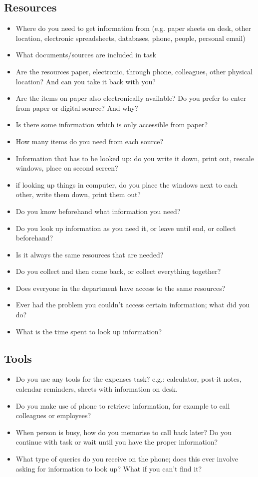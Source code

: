 \subsection{Resources}
\begin{itemize}
\item Where do you need to get information from (e.g. paper sheets on desk, other location, electronic spreadsheets, databases, phone, people, personal email)
\item What documents/sources are included in task
\item Are the resources paper, electronic, through phone, colleagues, other physical location? And can you take it back with you?
\item Are the items on paper also electronically available? Do you prefer to enter from paper or digital source? And why?
\item Is there some information which is only accessible from paper?
\item How many items do you need from each source?
\item Information that has to be looked up: do you write it down, print out, rescale windows, place on second screen?
\item if looking up things in computer, do you place the windows next to each other, write them down, print them out?
\item Do you know beforehand what information you need?
\item Do you look up information as you need it, or leave until end, or collect beforehand?
\item Is it always the same resources that are needed?
\item Do you collect and then come back, or collect everything together?
\item Does everyone in the department have access to the same resources?
\item Ever had the problem you couldn’t access certain information; what did you do?
\item What is the time spent to look up information?
\end{itemize}

\subsection{Tools}
\begin{itemize}
\item Do you use any tools for the expenses task? e.g.: calculator, post-it notes, calendar reminders, sheets with information on desk.
\item Do you make use of phone to retrieve information, for example to call colleagues or employees?
\item When person is busy, how do you memorise to call back later? Do you continue with task or wait until you have the proper information?
\item What type of queries do you receive on the phone; does this ever involve asking for information to look up? What if you can’t find it?
\end{itemize}

